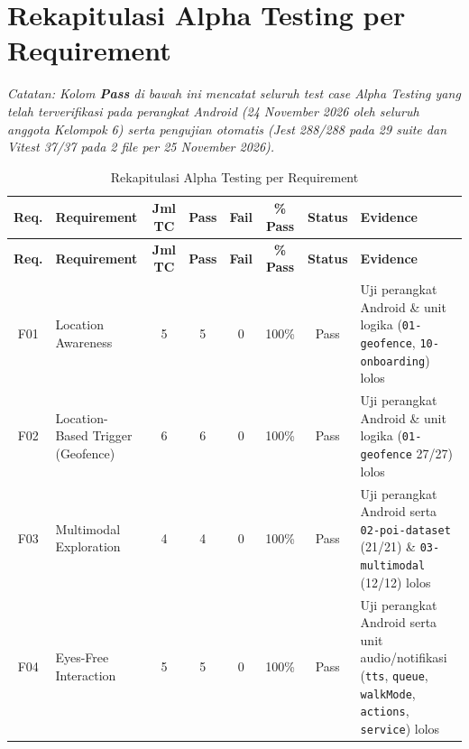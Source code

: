 \chapter{Rekapitulasi Alpha Testing per Requirement}
\label{bab:rekapitulasi-alpha}

\textit{Catatan: Kolom \textbf{Pass} di bawah ini mencatat seluruh test case Alpha Testing yang telah terverifikasi pada perangkat Android (24 November 2026 oleh seluruh anggota Kelompok 6) serta pengujian otomatis (Jest 288/288 pada 29 suite dan Vitest 37/37 pada 2 file per 25 November 2026).}

\begin{landscapepage}
{\footnotesize
\begin{longtable}{|C{0.06}|L{0.22}|C{0.08}|C{0.07}|C{0.07}|C{0.08}|C{0.13}|L{0.29}|}
\caption{Rekapitulasi Alpha Testing per Requirement}\\
\hline
{}\textbf{Req.} & \textbf{Requirement} & \textbf{Jml TC} & \textbf{Pass} & \textbf{Fail} & \textbf{\% Pass} & \textbf{Status} & \textbf{Evidence} \\ \hline
\endfirsthead
\hline
{}\textbf{Req.} & \textbf{Requirement} & \textbf{Jml TC} & \textbf{Pass} & \textbf{Fail} & \textbf{\% Pass} & \textbf{Status} & \textbf{Evidence} \\ \hline
\endhead
F01 & Location Awareness & 5 & 5 & 0 & 100\% & Pass & Uji perangkat Android \& unit logika (\texttt{01-geofence}, \texttt{10-onboarding}) lolos \\ \hline
F02 & Location-Based Trigger (Geofence) & 6 & 6 & 0 & 100\% & Pass & Uji perangkat Android \& unit logika (\texttt{01-geofence} 27/27) lolos \\ \hline
F03 & Multimodal Exploration & 4 & 4 & 0 & 100\% & Pass & Uji perangkat Android serta \texttt{02-poi-dataset} (21/21) \& \texttt{03-multimodal} (12/12) lolos \\ \hline
F04 & Eyes-Free Interaction & 5 & 5 & 0 & 100\% & Pass & Uji perangkat Android serta unit audio/notifikasi (\texttt{tts}, \texttt{queue}, \texttt{walkMode}, \texttt{actions}, \texttt{service}) lolos \\ \hline

\end{longtable}}
\end{landscapepage}
